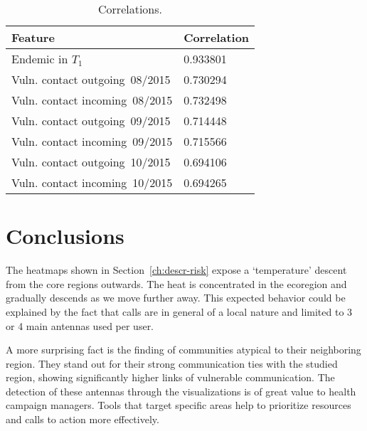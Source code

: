 \begin{table}\label{tab:featureCorrelations}
	\caption{Correlations.}
	\centering
	\begin{tabular}{l l }
		\toprule
		Feature & Correlation \\
		\midrule
		Endemic in $T_1$        & 0.933801 \\
		Vuln. contact outgoing\ 08/2015  & 0.730294 \\ %
		Vuln. contact incoming\ 08/2015   & 0.732498 \\
		Vuln. contact outgoing\ 09/2015  & 0.714448 \\
		Vuln. contact incoming\ 09/2015   & 0.715566 \\
		Vuln. contact outgoing\ 10/2015  & 0.694106 \\
		Vuln. contact incoming\ 10/2015   & 0.694265 \\
		\bottomrule
	\end{tabular}
\end{table}


%
%



\section{Conclusions}\label{section:conclusions}

The heatmaps shown in Section~\cref{ch:descr-risk} expose a `temperature' descent from the core regions outwards. The heat is concentrated in the ecoregion and gradually descends as we move further away. This expected behavior could be explained by the fact that calls are in general of a local nature and limited to 3 or 4 main antennas used per user.

A more surprising fact is the finding of communities atypical to their neighboring region. They stand out for their strong communication ties with the studied region, showing significantly higher links of vulnerable communication. The detection of these antennas through the visualizations is of great value to health campaign managers. Tools that target specific areas help to prioritize resources and calls to action more effectively.


